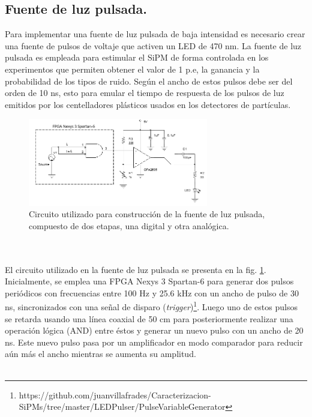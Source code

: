 \subsection{Fuente de luz pulsada.}
Para implementar una fuente de luz pulsada de baja intensidad es necesario crear una fuente de pulsos de voltaje que activen un LED de 470 nm. La fuente de luz pulsada es  empleada para estimular el SiPM de forma controlada en los experimentos que permiten obtener el valor de 1 p.e, la ganancia y la probabilidad de los tipos de ruido. Según \citep{Deisgn_LED_driver} el ancho de estos pulsos debe ser del orden de 10 ns, esto para emular el tiempo de respuesta de los pulsos de luz emitidos por los centelladores plásticos usados en los detectores de partículas.  
\begin{figure}[h!]
\begin{centering}
  \includegraphics[width=0.7\textwidth]{Images/LED_circuit.PNG}
    \caption{Circuito utilizado para construcción de la fuente de luz pulsada, compuesto de dos etapas, una digital y otra analógica.}
    \label{fig:LED_circuit}
  \par\end{centering}
\end{figure}
\\ \\
El circuito utilizado en la fuente de luz pulsada se presenta en la fig. \ref{fig:LED_circuit}. Inicialmente, se emplea una FPGA Nexys 3 Spartan-6 para generar dos pulsos periódicos con frecuencias entre 100 Hz y 25.6 kHz con un ancho de pulso de 30 ns, sincronizados con una señal de disparo (\textit{trigger})\footnote{https://github.com/juanvillafrades/Caracterizacion-SiPMs/tree/master/LEDPulser/PulseVariableGenerator}. Luego uno de estos pulsos se retarda usando una línea coaxial de 50 cm para posteriormente realizar una operación lógica (AND) entre éstos y generar un nuevo pulso con un ancho de 20 ns. Este nuevo pulso pasa por un amplificador en  modo comparador para reducir aún más el ancho mientras se aumenta su amplitud. \\ \\
